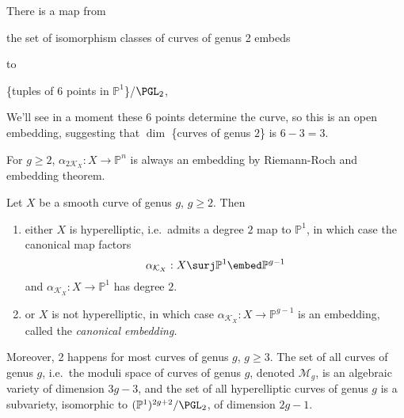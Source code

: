\documentclass[a4paper]{article}
\renewcommand*{\P}{\mathbb{P}}
\begin{document}
\begin{corollary}
  There is a map from
  
  the set of isomorphism classes of curves of genus 2 embeds

  to

  \{tuples of 6 points in \(\P^1\)\}/\(\PGL_2\),
\end{corollary}
We'll see in a moment these 6 points determine the curve, so this is an open embedding, suggesting that \(\dim\) \{curves of genus \(2\)\} is \(6 - 3 = 3\).

\begin{remark}
  For \(g \geq 2\), \(\alpha_{2\mathcal K_X}: X \to \P^n\) is always an embedding by Riemann-Roch and embedding theorem.
\end{remark}

\begin{proposition}
  Let \(X\) be a smooth curve of genus \(g\), \(g \geq 2\). Then
  \begin{enumerate}
  \item either \(X\) is hyperelliptic, i.e.\ admits a degree \(2\) map to \(\P^1\), in which case the canonical map factors
    \[
      \alpha_{\mathcal K_X}: X \surj \P^1 \embed \P^{g - 1}
    \]
    and \(\alpha_{\mathcal K_X}: X \to \P^1\) has degree \(2\).
  \item or \(X\) is not hyperelliptic, in which case \(\alpha_{\mathcal K_X}: X \to \P^{g - 1}\) is an embedding, called the \emph{canonical embedding}.
  \end{enumerate}
  Moreover, 2 happens for most curves of genus \(g\), \(g \geq 3\). The set of all curves of genus \(g\), i.e.\ the moduli space of curves of genus \(g\), denoted \(\mathcal M_g\), is an algebraic variety of dimension \(3g - 3\), and the set of all hyperelliptic curves of genus \(g\) is a subvariety, isomorphic to \((\P^1)^{2g + 2}/\PGL_2\), of dimension \(2g - 1\).
\end{proposition}
\end{document}
